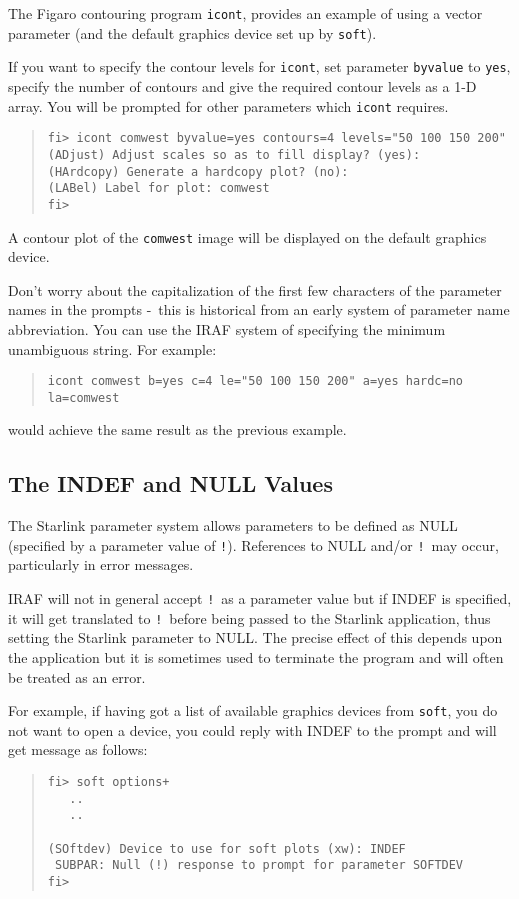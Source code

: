 \documentclass[twoside,11pt]{article}
\newcommand{\xlabel}[1]{}
\newcommand{\dash}{--}
\renewcommand{\dash}{-}
\begin{document}
The Figaro contouring program \texttt{icont}, provides 
an example of using a vector parameter (and the default graphics device set up
by \texttt{soft}).

If you want to specify the contour levels for \texttt{icont}, set
parameter \texttt{byvalue} to \texttt{yes}, specify the number of contours 
and give the required contour levels as a 1-D array. You will be prompted for
other parameters which \texttt{icont} requires.
\begin{quote} \begin{verbatim}
fi> icont comwest byvalue=yes contours=4 levels="50 100 150 200"
(ADjust) Adjust scales so as to fill display? (yes):
(HArdcopy) Generate a hardcopy plot? (no):
(LABel) Label for plot: comwest
fi>
\end{verbatim} \end{quote}
A contour plot of the \texttt{comwest} image will be displayed on the default 
graphics device.

Don't worry about the capitalization of the first few characters of the 
parameter names in the prompts \dash\ this is historical from an early system
of parameter name abbreviation. You can use the IRAF system of specifying the
minimum unambiguous string. For example:
\begin{quote} \begin{verbatim}
icont comwest b=yes c=4 le="50 100 150 200" a=yes hardc=no la=comwest
\end{verbatim} \end{quote}
would achieve the same result as the previous example.

\subsection{\xlabel{the_indef_and_null_values}\label{indef_and_null}The INDEF and NULL Values}
The Starlink parameter system allows parameters to be defined as NULL 
(specified by a parameter value of \texttt{!}). 
References to NULL and/or \texttt{!}\ may occur, particularly in error messages.

IRAF will not in general accept \texttt{!}\ as a parameter value but if INDEF 
is specified, it will get translated to \texttt{!}\ before being passed to the 
Starlink application, thus setting the Starlink parameter to NULL. 
The precise effect of this depends upon the application but it is sometimes
used to terminate the program and will often be treated as an error.

For example, if having got a list of available graphics devices from
\texttt{soft}, you do not want to open a device, you could reply with INDEF to
the prompt and will get message as follows:
\begin{quote} \begin{verbatim}
fi> soft options+
   ..
   ..

(SOftdev) Device to use for soft plots (xw): INDEF
 SUBPAR: Null (!) response to prompt for parameter SOFTDEV
fi>
\end{verbatim} \end{quote}
\end{document}
